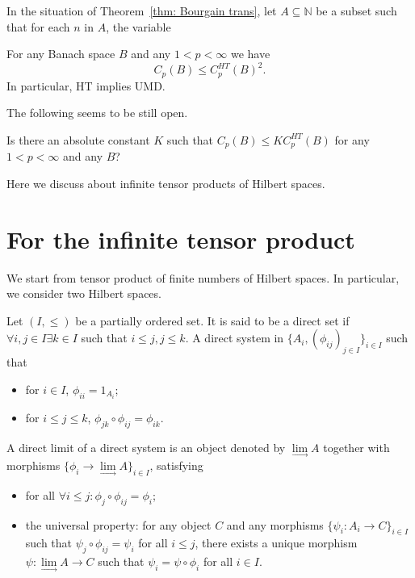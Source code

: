 \begin{corollary}
    In the situation of Theorem~\ref{thm: Bourgain trans}, let $A\subseteq\mathbb{N}$ be a subset such
    that for each $n$ in $A$, the variable
\end{corollary}

\begin{corollary}
    For any Banach space $B$ and any $1 < p < \infty$ we have
        \[  C_p(B) \leq C_p^{HT}(B)^2.  \]
    In particular, HT implies UMD.
\end{corollary}

The following seems to be still open.
\begin{problem}
    Is there an absolute constant $K$ such that $C_p(B) \leq K C_p^{HT} (B)$ for
any $1 < p < \infty$ and any $B$?
\end{problem}

\appendix

Here we discuss about infinite tensor products of Hilbert spaces.

\section{For the infinite tensor product}
We start from tensor product of finite numbers of Hilbert spaces. In particular, we consider two Hilbert spaces.

\begin{definition}
    
\end{definition}

\begin{definition}
    Let $(I,\leq)$ be a partially ordered set. It is said to be a direct set if $\forall i,j\in I\exists k\in I$ such that $i\leq j, j\leq k$. A direct system in $\{A_i,(\phi_{i j})_{j\in I}\}_{i\in I}$ such that 
    \begin{itemize}
        \item for $i\in I$, $\phi_{ii}=1_{A_i}$;
        \item for $i\leq j\leq k$, $\phi_{j k}\circ\phi_{i j}=\phi_{i k}$.
    \end{itemize}
    A direct limit of a direct system is an object denoted by $\lim\limits_{\longrightarrow} A$ together with morphisms $\{\phi_i\to\lim\limits_{\longrightarrow} A\}_{i\in I}$, satisfying
    \begin{itemize}
        \item for all $\forall i\leq j\colon\phi_{j}\circ\phi_{i j}=\phi_i$;
        \item the universal property: for any object $C$ and any morphisms $\{\psi_i\colon A_i\to C\}_{i\in I}$ such that $\psi_j\circ\phi_{i j}=\psi_i$ for all $i\leq j$, there exists a unique morphism $\psi\colon \lim\limits_{\longrightarrow} A\to C$ such that $\psi_i=\psi\circ\phi_i$ for all $i\in I$.
    \end{itemize}
\end{definition}

